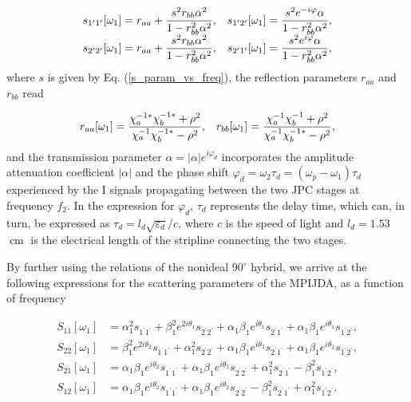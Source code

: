 \documentclass[aip,onecolumn,10pt]{revtex4}%
\begin{document}
\begin{align}
\begin{array}
[c]{cc}%
s_{1^{\prime}1^{\prime}}[\omega_{1}]=r_{aa}+\dfrac{s^2r_{bb}\alpha^2}{1-r^2_{bb}\alpha^2}, & s_{1^{\prime}2^{\prime}}[\omega_{1}]=\dfrac{s^2e^{-i\varphi}\alpha}{1-r^2_{bb}\alpha^2},  \\
s_{2^{\prime}2^{\prime}}[\omega_{1}]=r_{aa}+\dfrac{s^2r_{bb}\alpha^2}{1-r^2_{bb}\alpha^2}, & 
s_{2^{\prime}1^{\prime}}[\omega_{1}]=\dfrac{s^2e^{i\varphi}\alpha}{1-r^2_{bb}\alpha^2},  \\
\end{array}
\label{s_nonidealhyb}%
\end{align}
where $s$ is given by Eq. (\ref{s_param_vs_freq}), the reflection parameters $r_{aa}$ and $r_{bb}$ read \cite{JPCreview} 

\begin{align}
\begin{array}
[c]{cc}%
r_{aa}[\omega_1]=\dfrac{\chi_{a}^{-1*}\chi_{b}^{-1*}+\rho^2}{\chi_{a}^{-1}\chi_{b}^{-1*}-\rho^2}, & 
r_{bb}[\omega_1]=\dfrac{\chi_{a}^{-1}\chi_{b}^{-1}+\rho^2}{\chi_{a}^{-1}\chi_{b}^{-1*}-\rho^2}, \\
\end{array}
\label{r_aa_r_bb}%
\end{align}
and the transmission parameter $\alpha=|\alpha|e^{i\varphi_{d}}$ incorporates the amplitude attenuation coefficient $|\alpha|$ and the phase shift $\varphi_{d}=\omega_2\tau_d=(\omega_p-\omega_1)\tau_d$ experienced by the I signals propagating between the two JPC stages at frequency $f_2$. In the expression for $\varphi_{d}$, $\tau_d$ represents the delay time, which can, in turn, be expressed as $\tau_d=l_d\sqrt{\varepsilon_d}/c$, where $c$ is the speed of light and $l_d=1.53$ $\operatorname{cm}$ is the electrical length of the stripline connecting the two stages.

By further using the relations of the nonideal $90^{\circ}$ hybrid, we arrive at the following expressions for the scattering parameters of the MPIJDA, as a function of frequency

\begin{align}
S_{11}[\omega_1] & =\alpha_1^2s_{1^{\prime}1^{\prime}}+\beta_1^2e^{2i\theta_1}s_{2^{\prime}2^{\prime}}+ 
\alpha_1\beta_1e^{i\theta_1}s_{2^{\prime}1^{\prime}}+\alpha_1\beta_1e^{i\theta_1}s_{1^{\prime}2^{\prime}}, \label{S_11_nonidealhyb} \\ 
S_{22}[\omega_1] & =\beta_1^2e^{2i\theta_2}s_{1^{\prime}1^{\prime}}+\alpha_1^2s_{2^{\prime}2^{\prime}}+
\alpha_1\beta_1e^{i\theta_2}s_{2^{\prime}1^{\prime}}+\alpha_1\beta_1e^{i\theta_2}s_{1^{\prime}2^{\prime}}, \label{S_22_nonidealhyb} \\ 
S_{21}[\omega_1] & =\alpha_1\beta_1e^{i\theta_2}s_{1^{\prime}1^{\prime}}+\alpha_1\beta_1e^{i\theta_2}s_{2^{\prime}2^{\prime}}+ 
\alpha_1^2s_{2^{\prime}1^{\prime}}-\beta_1^2s_{1^{\prime}2^{\prime}},  \label{S_21_nonidealhyb} \\ 
S_{12}[\omega_1] & =\alpha_1\beta_1e^{i\theta_2}s_{1^{\prime}1^{\prime}}+\alpha_1\beta_1e^{i\theta_2}s_{2^{\prime}2^{\prime}}- 
\beta_1^2s_{2^{\prime}1^{\prime}}+\alpha_1^2s_{1^{\prime}2^{\prime}}. \label{S_12_nonidealhyb} 
\end{align}
\end{document}
